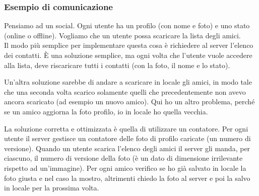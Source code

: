 \subsubsection{Esempio di comunicazione}
Pensiamo ad un social. Ogni utente ha un profilo (con nome e foto) e uno stato (online o offline). Vogliamo che un utente possa scaricare la lista degli amici. 
\\ Il modo più semplice per implementare questa cosa è richiedere al server l'elenco dei contatti. 
È una soluzione semplice, ma ogni volta che l'utente vuole accedere alla lista, deve riscaricare tutti i contatti (con la foto, il nome e lo stato). 

Un'altra soluzione sarebbe di andare a scaricare in locale gli amici, in modo tale che una seconda volta scarico solamente quelli che precedentemente non avevo ancora scaricato (ad esempio un nuovo amico).
Qui ho un altro problema, perché se un amico aggiorna la foto profilo, io in locale ho quella vecchia. 

La soluzione corretta e ottimizzata è quella di utilizzare un contatore. Per ogni utente il server gestisce un contatore delle foto di profilo caricate (un numero di versione). Quando un utente scarica l’elenco degli amici il server gli manda, per ciascuno, il numero di versione della foto (è un dato di dimensione irrilevante rispetto ad un’immagine). Per ogni amico verifico se ho già salvato in locale la foto giusta e nel caso la mostro, altrimenti chiedo la foto al server e poi la salvo in locale per la prossima volta.

